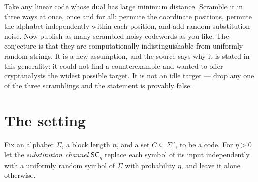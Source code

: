 \documentclass{aicr-conjecture}
\newcommand{\SC}{\mathsf{SC}}
\begin{document}

\vspace{0.4em}

\begin{informalconjecture}
Take any linear code whose dual has large minimum distance. Scramble it
in three ways at once, once and for all: permute the coordinate
positions, permute the alphabet independently within each position, and
add random substitution noise. Now publish as many scrambled noisy
codewords as you like. The conjecture is that they are computationally
indistinguishable from uniformly random strings. It is a new assumption,
and the source says why it is stated in this generality: it could not
find a counterexample and wanted to offer cryptanalysts the widest
possible target. It is not an idle target --- drop any one of the three
scramblings and the statement is provably false.
\end{informalconjecture}

\section{The setting}\label{sec:setting}

Fix an alphabet $\Sigma$, a block length $n$, and a set
$C \subseteq \Sigma^{n}$, to be a code. For $\eta > 0$ let the
\emph{substitution channel} $\SC_{\eta}$ replace each symbol of its input
independently with a uniformly random symbol of $\Sigma$ with probability
$\eta$, and leave it alone otherwise.
\end{document}
